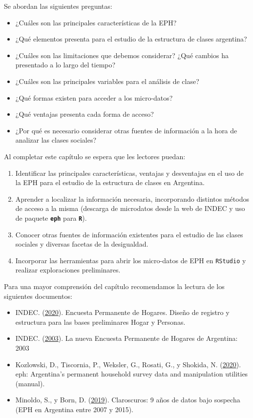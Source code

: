 \documentclass[
]{article}
\providecommand{\tightlist}{%
  \setlength{\itemsep}{0pt}\setlength{\parskip}{0pt}}
\begin{document}
Se abordan las siguientes preguntas:

\begin{itemize}
\tightlist
\item
  ¿Cuáles son las principales características de la EPH?
\item
  ¿Qué elementos presenta para el estudio de la estructura de clases argentina?
\item
  ¿Cuáles son las limitaciones que debemos considerar? ¿Qué cambios ha presentado a lo largo del tiempo?
\item
  ¿Cuáles son las principales variables para el análisis de clase?
\item
  ¿Qué formas existen para acceder a los micro-datos?
\item
  ¿Qué ventajas presenta cada forma de acceso?
\item
  ¿Por qué es necesario considerar otras fuentes de información a la hora de analizar las clases sociales?
\end{itemize}

Al completar este capítulo se espera que les lectores puedan:

\begin{enumerate}
\def\labelenumi{\arabic{enumi}.}
\tightlist
\item
  Identificar las principales características, ventajas y desventajas en el uso de la EPH para el estudio de la estructura de clases en Argentina.
\item
  Aprender a localizar la información necesaria, incorporando distintos métodos de acceso a la misma (descarga de microdatos desde la web de INDEC y uso de paquete \textbf{\texttt{eph}} para \textbf{\texttt{R}}).
\item
  Conocer otras fuentes de información existentes para el estudio de las clases sociales y diversas facetas de la desigualdad.
\item
  Incorporar las herramientas para abrir los micro-datos de EPH en \texttt{RStudio} y realizar exploraciones preliminares.
\end{enumerate}

Para una mayor comprensión del capítulo recomendamos la lectura de los siguientes documentos:

\begin{itemize}
\item
  INDEC. (\protect\hyperlink{ref-INDEC2020}{2020}). Encuesta Permanente de Hogares. Diseño de registro y estructura para las bases preliminares Hogar y Personas.
\item
  INDEC. (\protect\hyperlink{ref-INDEC2003}{2003}). La nueva Encuesta Permanente de Hogares de Argentina: 2003
\item
  Kozlowski, D., Tiscornia, P., Weksler, G., Rosati, G., y Shokida, N. (\protect\hyperlink{ref-kozlowski2020}{2020}). eph: Argentina's permanent household survey data and manipulation utilities (manual).
\item
  Minoldo, S., y Born, D. (\protect\hyperlink{ref-Minoldo.Born2019}{2019}). Claroscuros: 9 años de datos bajo sospecha (EPH en Argentina entre 2007 y 2015).
\end{itemize}
\end{document}
